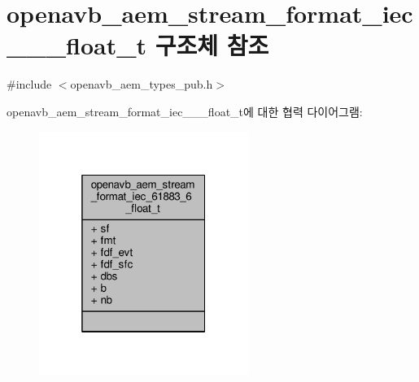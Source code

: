 \hypertarget{structopenavb__aem__stream__format__iec__61883__6__float__t}{}\section{openavb\+\_\+aem\+\_\+stream\+\_\+format\+\_\+iec\+\_\+\_\+\_\+float\+\_\+t 구조체 참조}
\label{structopenavb__aem__stream__format__iec__61883__6__float__t}


{\ttfamily \#include $<$openavb\+\_\+aem\+\_\+types\+\_\+pub.\+h$>$}



openavb\+\_\+aem\+\_\+stream\+\_\+format\+\_\+iec\+\_\+\_\+\_\+float\+\_\+t에 대한 협력 다이어그램\+:
\nopagebreak
\begin{figure}[H]
\begin{center}
\leavevmode
\includegraphics[width=193pt]{structopenavb__aem__stream__format__iec__61883__6__float__t__coll__graph}
\end{center}
\end{figure}
